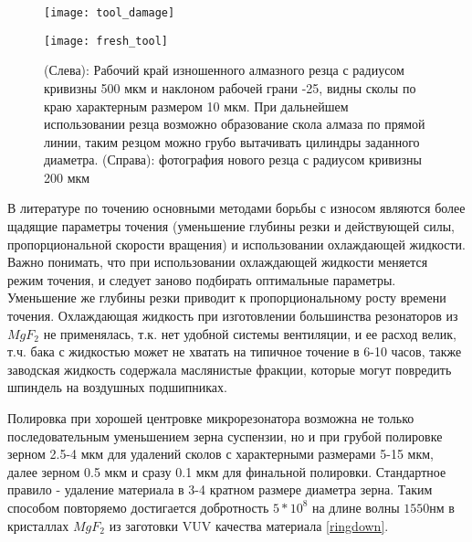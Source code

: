 \begin{figure}[ht]
  \begin{minipage}[ht]{0.49\linewidth}\centering
    \texttt{[image: tool\_damage]}
  \end{minipage}
  \hfill
  \begin{minipage}[ht]{0.49\linewidth}\centering
    \texttt{[image: fresh\_tool]}
  \end{minipage}
  \caption{(Слева): Рабочий край изношенного алмазного резца с радиусом кривизны 500 мкм и наклоном рабочей грани -25, видны сколы по краю характерным размером 10 мкм. При дальнейшем использовании резца возможно образование скола алмаза по прямой линии, таким резцом можно грубо вытачивать цилиндры заданного диаметра. (Справа): фотография нового резца с радиусом кривизны 200 мкм}
  \label{tool_damage}
\end{figure}



В литературе по точению основными методами борьбы с износом являются более щадящие параметры точения (уменьшение глубины резки и действующей силы, пропорциональной скорости вращения) и использовании охлаждающей жидкости. Важно понимать, что при использовании охлаждающей жидкости меняется режим точения, и следует заново подбирать оптимальные параметры. Уменьшение же глубины резки приводит к пропорциональному росту времени точения. Охлаждающая жидкость при изготовлении большинства резонаторов из $MgF_2$ не применялась, т.к. нет удобной системы вентиляции, и ее расход велик, т.ч. бака с жидкостью может не хватать на типичное точение в 6-10 часов, также заводская жидкость содержала маслянистые фракции, которые могут повредить шпиндель на воздушных подшипниках.

Полировка при хорошей центровке микрорезонатора возможна не только последовательным уменьшением зерна суспензии, но и при грубой полировке зерном 2.5-4 мкм для удалений сколов с характерными размерами 5-15 мкм, далее зерном 0.5 мкм и сразу 0.1 мкм для финальной полировки. Стандартное правило - удаление материала в 3-4 кратном размере диаметра зерна. Таким способом повторяемо достигается добротность $5*10^8$ на длине волны $1550 нм$ в кристаллах $MgF_2$ из заготовки VUV качества материала \ref{ringdown}.


